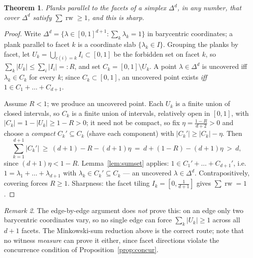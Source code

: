 \documentclass[11pt,reqno]{amsart}
\theoremstyle{plain}
\newtheorem{theorem}{Theorem}[section]
\theoremstyle{definition}
\theoremstyle{remark}
\newtheorem{remark}[theorem]{Remark}
\newcommand{\rw}{\operatorname{rw}}
\begin{document}
\begin{theorem}\label{thm:facet}
Planks parallel to the facets of a simplex $\Delta^d$, in any number, that cover
$\Delta^d$ satisfy $\sum\rw\ge1$, and this is sharp.
\end{theorem}
\begin{proof}
Write $\Delta^d=\{\lambda\in[0,1]^{d+1}:\sum_k\lambda_k=1\}$ in barycentric
coordinates; a plank parallel to facet $k$ is a coordinate slab
$\{\lambda_k\in I\}$. Grouping the planks by facet, let
$U_k=\bigcup_{c(i)=k}I_i\subset[0,1]$ be the forbidden set on facet $k$, so
$\sum_k|U_k|\le\sum_i|I_i|=:R$, and set $C_k=[0,1]\setminus U_k$. A point
$\lambda\in\Delta^d$ is uncovered iff $\lambda_k\in C_k$ for every $k$; since
$C_k\subset[0,1]$, an uncovered point exists \emph{iff}
$1\in C_1+\dots+C_{d+1}$.

Assume $R<1$; we produce an uncovered point. Each $U_k$ is a finite union of
closed intervals, so $C_k$ is a finite union of intervals, relatively open in
$[0,1]$, with $|C_k|=1-|U_k|\ge1-R>0$; it need not be compact, so fix
$\eta=\tfrac{1-R}{d+2}>0$ and choose a \emph{compact} $C_k'\subseteq C_k$ (shave
each component) with $|C_k'|\ge|C_k|-\eta$. Then
\[
\textstyle\sum_{k=1}^{d+1}|C_k'|\ \ge\ (d+1)-R-(d+1)\eta\ =\ d+(1-R)-(d+1)\eta
\ >\ d,
\]
since $(d+1)\eta<1-R$. Lemma~\ref{lem:sumset} applies: $1\in C_1'+\dots+C_{d+1}'$,
i.e.\ $1=\lambda_1+\dots+\lambda_{d+1}$ with
$\lambda_k\in C_k'\subseteq C_k$ --- an uncovered $\lambda\in\Delta^d$.
Contrapositively, covering forces $R\ge1$. Sharpness: the facet tiling
$I_k=[0,\tfrac1{d+1}]$ gives $\sum\rw=1$.
\end{proof}
\begin{remark}
The edge-by-edge argument does \emph{not} prove this: on an edge only two
barycentric coordinates vary, so no single edge can force $\sum_k|U_k|\ge1$ across
all $d+1$ facets. The Minkowski-sum reduction above is the correct route; note that
no witness \emph{measure} can prove it either, since facet directions violate the
concurrence condition of Proposition~\ref{prop:concur}.
\end{remark}
\end{document}
